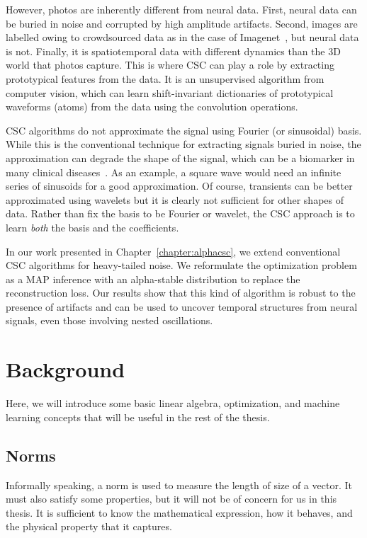 However, photos are inherently different from neural data. First, neural data can be buried in noise and corrupted by high amplitude artifacts. Second, images are labelled owing to crowdsourced data as in the case of  Imagenet~\citep{deng2009imagenet}, but neural data is not. Finally, it is spatiotemporal data with different dynamics than the 3D world that photos capture. This is where \ac{CSC} can play a role by extracting prototypical features from the data. It is an unsupervised algorithm from computer vision, which can learn shift-invariant dictionaries of prototypical waveforms (atoms) from the data using the convolution operations.

\ac{CSC} algorithms do not approximate the signal using Fourier (or sinusoidal) basis. While this is the conventional technique for extracting signals buried in noise, the approximation can degrade the shape of the signal, which can be a biomarker in many clinical diseases~\citep{cole2017brain}. As an example, a square wave would need an infinite series of sinusoids for a good approximation. Of course, transients can be better approximated using wavelets but it is clearly not sufficient for other shapes of data. Rather than fix the basis to be Fourier or wavelet, the \ac{CSC} approach is to learn \emph{both} the basis and the coefficients.

In our work presented in Chapter~\ref{chapter:alphacsc}, we extend conventional \ac{CSC} algorithms for heavy-tailed noise. We reformulate the optimization problem as a \ac{MAP} inference with an alpha-stable distribution to replace the reconstruction loss. Our results show that this kind of algorithm is robust to the presence of artifacts and can be used to uncover temporal structures from neural signals, even those involving nested oscillations.

\section{Background}

Here, we will introduce some basic linear algebra, optimization, and machine learning concepts that will be useful in the rest of the thesis.

\subsection{Norms}
Informally speaking, a norm is used to measure the length of size of a vector. It must also satisfy some properties, but it will not be of concern for us in this thesis. It is sufficient to know the mathematical expression, how it behaves, and the physical property that it captures.
\theoremstyle{definition}
\newtheorem{definition}{Definition}[chapter]

